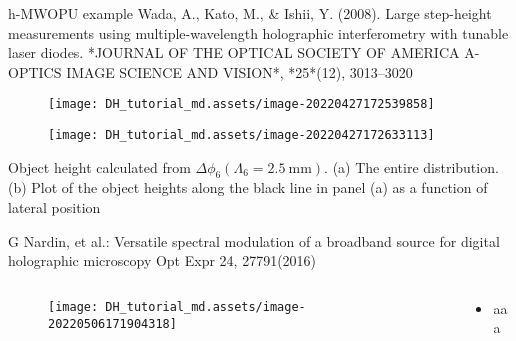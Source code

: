 \documentclass[t, aspectratio=169]{beamer}
\begin{document}
\begin{frame}[allowframebreaks]{h-MWOPU example}
Wada, A., Kato, M., \& Ishii, Y. (2008). Large step-height measurements using multiple-wavelength holographic interferometry with tunable laser diodes. *JOURNAL OF THE OPTICAL SOCIETY OF AMERICA A-OPTICS IMAGE SCIENCE AND VISION*, *25*(12), 3013–3020
	\begin{figure}
		\texttt{[image: DH\_tutorial\_md.assets/image-20220427172539858]}
	\end{figure}
	\begin{figure}
		\texttt{[image: DH\_tutorial\_md.assets/image-20220427172633113]}
	\end{figure}
Object height calculated from $\Delta\phi_6(\Lambda_6=2.5\ \textrm{mm})$. (a) The entire distribution. (b) Plot of the object heights along the black line in panel (a) as a function of lateral position
\end{frame}


\begin{frame}{G Nardin, et al.: Versatile spectral modulation of a broadband source for digital holographic microscopy}
	\vspace{-3 mm}
	\small Opt Expr 24, 27791(2016)
	\begin{columns}
		\begin{column}{.6\textwidth}
			\begin{figure}
				\texttt{[image: DH\_tutorial\_md.assets/image-20220506171904318]}
			\end{figure}
		\end{column}
		\begin{column}{.4\textwidth}
			\begin{itemize}
				\item aaa
			\end{itemize}
		\end{column}
	\end{columns}
\end{frame}


\end{document}
